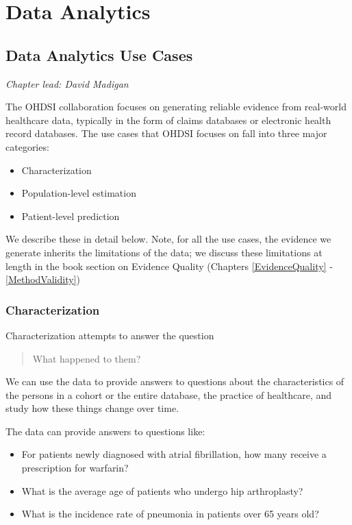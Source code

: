 \documentclass[11pt]{book}
\providecommand{\tightlist}{%
  \setlength{\itemsep}{0pt}\setlength{\parskip}{0pt}}
\theoremstyle{definition}
\theoremstyle{definition}
\theoremstyle{definition}
\theoremstyle{remark}
\begin{document}
\hypertarget{part-data-analytics}{%
\part{Data Analytics}\label{part-data-analytics}}

\hypertarget{DataAnalyticsUseCases}{%
\chapter{Data Analytics Use Cases}\label{DataAnalyticsUseCases}}

\emph{Chapter lead: David Madigan}

The OHDSI collaboration focuses on generating reliable evidence from real-world healthcare data, typically in the form of claims databases or electronic health record databases. The use cases that OHDSI focuses on fall into three major categories:

\begin{itemize}
\tightlist
\item
  Characterization
\item
  Population-level estimation
\item
  Patient-level prediction
\end{itemize}

We describe these in detail below. Note, for all the use cases, the evidence we generate inherits the limitations of the data; we discuss these limitations at length in the book section on Evidence Quality (Chapters \ref{EvidenceQuality} - \ref{MethodValidity})

\hypertarget{characterization}{%
\section{Characterization}\label{characterization}}

Characterization attempts to answer the question

\begin{quote}
What happened to them?
\end{quote}

We can use the data to provide answers to questions about the characteristics of the persons in a cohort or the entire database, the practice of healthcare, and study how these things change over time.

The data can provide answers to questions like:

\begin{itemize}
\tightlist
\item
  For patients newly diagnosed with atrial fibrillation, how many receive a prescription for warfarin?
\item
  What is the average age of patients who undergo hip arthroplasty?
\item
  What is the incidence rate of pneumonia in patients over 65 years old?
\end{itemize}
\end{document}
